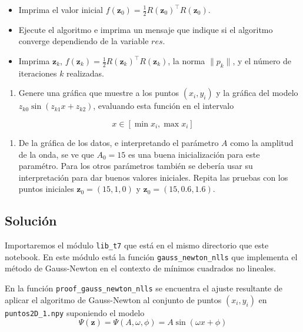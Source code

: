 \documentclass[11pt]{article}
\providecommand{\tightlist}{%
      \setlength{\itemsep}{0pt}\setlength{\parskip}{0pt}}
\begin{document}
\begin{itemize}
\tightlist
\item
  Imprima el valor inicial
  \(f(\mathbf{z}_0) = \frac{1}{2} R(\mathbf{z}_0)^\top R(\mathbf{z}_0)\).
\item
  Ejecute el algoritmo e imprima un mensaje que indique si el algoritmo
  converge dependiendo de la variable \(res\).
\item
  Imprima \(\mathbf{z}_k\),
  \(f(\mathbf{z}_k) = \frac{1}{2} R(\mathbf{z}_k)^\top R(\mathbf{z}_k)\),
  la norma \(\|p_k\|\), y el número de iteraciones \(k\) realizadas.
\end{itemize}

\begin{enumerate}
\def\labelenumi{\arabic{enumi}.}
\setcounter{enumi}{3}
\tightlist
\item
  Genere una gráfica que muestre a los puntos \((x_i, y_i)\) y la
  gráfica del modelo \(z_{k0} \sin(z_{k1} x + z_{k2})\), evaluando esta
  función en el intervalo
\end{enumerate}

\[x \in [\min x_i, \max x_i]\]

\begin{enumerate}
\def\labelenumi{\arabic{enumi}.}
\setcounter{enumi}{4}
\tightlist
\item
  De la gráfica de los datos, e interpretando el parámetro \(A\) como la
  amplitud de la onda, se ve que \(A_0=15\) es una buena inicialización
  para este paramétro. Para los otros parámetros también se debería usar
  su interpretación para dar buenos valores iniciales. Repita las
  pruebas con los puntos iniciales \(\mathbf{z}_0 = (15, 1, 0)\) y
  \(\mathbf{z}_0 = (15, 0.6, 1.6)\).
\end{enumerate}

    \hypertarget{soluciuxf3n}{%
\subsection{Solución}\label{soluciuxf3n}}

Importaremos el módulo \texttt{lib\_t7} que está en el mismo directorio
que este notebook. En este módulo está la función
\texttt{gauss\_newton\_nlls} que implementa el método de Gauss-Newton en
el contexto de mínimos cuadrados no lineales.

En la función \texttt{proof\_gauss\_newton\_nlls} se encuentra el ajuste
resultante de aplicar el algoritmo de Gauss-Newton al conjunto de puntos
\((x_i,y_i)\) en \texttt{puntos2D\_1.npy} suponiendo el modelo
\[ \Psi(\mathbf{z})=\Psi(A,\omega,\phi)=A\sin(\omega x+\phi)\]
\end{document}
